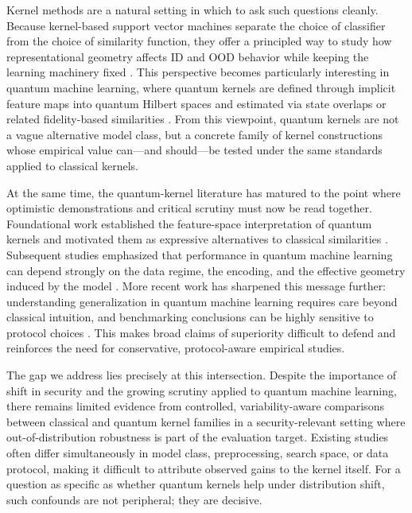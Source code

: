 \documentclass[pdflatex,sn-mathphys-num]{sn-jnl}%
\theoremstyle{thmstyleone}%
\theoremstyle{thmstyletwo}%
\theoremstyle{thmstylethree}%
\begin{document}
Kernel methods are a natural setting in which to ask such questions cleanly. Because kernel-based support vector machines separate the choice of classifier from the choice of similarity function, they offer a principled way to study how representational geometry affects ID and OOD behavior while keeping the learning machinery fixed \cite{cortes1995svm,scholkopf2002learningwithkernels}. This perspective becomes particularly interesting in quantum machine learning, where quantum kernels are defined through implicit feature maps into quantum Hilbert spaces and estimated via state overlaps or related fidelity-based similarities \cite{havlicek2019quantumenhanced,schuld2019featurehilbert,schuld2021kernelmethods}. From this viewpoint, quantum kernels are not a vague alternative model class, but a concrete family of kernel constructions whose empirical value can---and should---be tested under the same standards applied to classical kernels.

At the same time, the quantum-kernel literature has matured to the point where optimistic demonstrations and critical scrutiny must now be read together. Foundational work established the feature-space interpretation of quantum kernels and motivated them as expressive alternatives to classical similarities \cite{havlicek2019quantumenhanced,schuld2019featurehilbert}. Subsequent studies emphasized that performance in quantum machine learning can depend strongly on the data regime, the encoding, and the effective geometry induced by the model \cite{huang2021powerofdata,schuld2021encoding}. More recent work has sharpened this message further: understanding generalization in quantum machine learning requires care beyond classical intuition, and benchmarking conclusions can be highly sensitive to protocol choices \cite{gilfuster2024rethinkinggeneralization,bowles2024betterthanclassical,schnabel2025scrutiny}. This makes broad claims of superiority difficult to defend and reinforces the need for conservative, protocol-aware empirical studies.

The gap we address lies precisely at this intersection. Despite the importance of shift in security and the growing scrutiny applied to quantum machine learning, there remains limited evidence from controlled, variability-aware comparisons between classical and quantum kernel families in a security-relevant setting where out-of-distribution robustness is part of the evaluation target. Existing studies often differ simultaneously in model class, preprocessing, search space, or data protocol, making it difficult to attribute observed gains to the kernel itself. For a question as specific as whether quantum kernels help under distribution shift, such confounds are not peripheral; they are decisive.
\end{document}
